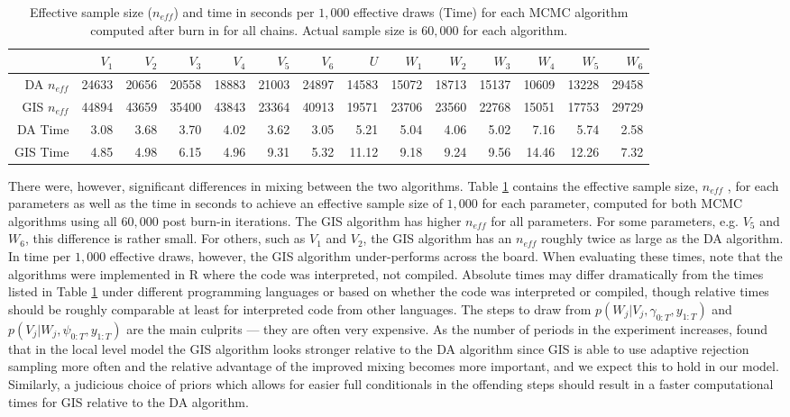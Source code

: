 \documentclass[graybox]{svmult}
\begin{document}
\begin{table}[ht]
\centering
\begin{tabular}{rrrrrrrrrrrrrr}
  \hline
 & $V_1$ & $V_2$ & $V_3$ & $V_4$ & $V_5$ & $V_6$ & $U$ & $W_1$ & $W_2$ & $W_3$ & $W_4$ & $W_5$ & $W_6$ \\ 
  \hline
DA $n_{eff}$ & 24633 & 20656 & 20558 & 18883 & 21003 & 24897 & 14583 & 15072 & 18713 & 15137 & 10609 & 13228 & 29458 \\ 
GIS $n_{eff}$   & 44894 & 43659 & 35400 & 43843 & 23364 & 40913 & 19571 & 23706 & 23560 & 22768 & 15051 & 17753 & 29729 \\ 
DA Time & 3.08 & 3.68 & 3.70 & 4.02 & 3.62 & 3.05 & 5.21 & 5.04 & 4.06 & 5.02 & 7.16 & 5.74 & 2.58 \\ 
GIS Time & 4.85 & 4.98 & 6.15 & 4.96 & 9.31 & 5.32 & 11.12 & 9.18 & 9.24 & 9.56 & 14.46 & 12.26 & 7.32 \\ 
   \hline
\end{tabular}
\caption{Effective sample size ($n_{eff}$) and time in seconds per $1,000$ effective draws (Time) for each MCMC algorithm computed after burn in for all chains. Actual sample size is $60,000$ for each algorithm.}
\label{tab:neff}
\end{table}

There were, however, significant differences in mixing between the two algorithms. Table \ref{tab:neff} contains the effective sample size, $n_{eff}$ \citep{gelman2013bayesian}, for each parameters as well as the time in seconds to achieve an effective sample size of $1,000$ for each parameter, computed for both MCMC algorithms using all $60,000$ post burn-in iterations. The GIS algorithm has higher $n_{eff}$ for all parameters. For some parameters, e.g. $V_5$ and $W_6$, this difference is rather small. For others, such as $V_1$ and $V_2$, the GIS algorithm has an $n_{eff}$ roughly twice as large as the DA algorithm. In time per $1,000$ effective draws, however, the GIS algorithm under-performs across the board. When evaluating these times, note that the algorithms were implemented in R where the code was interpreted, not compiled. Absolute times may differ dramatically from the times listed in Table \ref{tab:neff} under different programming languages or based on whether the code was interpreted or compiled, though relative times should be roughly comparable at least for interpreted code from other languages. The steps to draw from $p(W_j|V_j,\gamma_{0:T},y_{1:T})$ and $p(V_j|W_j,\psi_{0:T},y_{1:T})$ are the main culprits --- they are often very expensive. As the number of periods in the experiment increases, \cite{simpson2014interweaving} found that in the local level model the GIS algorithm looks stronger relative to the DA algorithm since GIS is able to use adaptive rejection sampling more often and the relative advantage of the improved mixing becomes more important, and we expect this to hold in our model. Similarly, a judicious choice of priors which allows for easier full conditionals in the offending steps should result in a faster computational times for GIS relative to the DA algorithm.
\end{document}
